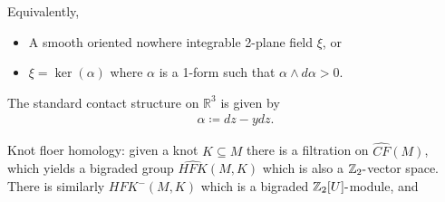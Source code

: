 \begin{definition}

Equivalently,

\begin{itemize}
\item
  A smooth oriented nowhere integrable 2-plane field \(\xi\), or
\item
  \(\xi = \ker( \alpha)\) where \(\alpha\) is a 1-form such that
  \(\alpha\wedge d \alpha > 0\).
\end{itemize}

\end{definition}

\begin{example}[?]

The standard contact structure on \({\mathbb{R}}^3\) is given by
\begin{align*}
\alpha\coloneqq dz - ydz
.\end{align*}

\end{example}

Knot floer homology: given a knot \(K \subseteq M\) there is a
filtration on \(\widehat{CF}(M)\), which yields a bigraded group
\(\widehat{HFK}(M, K)\) which is also a
\({\mathbb{Z}}_2{\hbox{-}}\)vector space. There is similarly
\(HFK^-(M, K)\) which is a bigraded
\({\mathbb{Z}}_2[U] {\hbox{-}}\)module, and

\cleardoublepage

\renewcommand{\listtheoremname}{}
\listoftheorems[ignoreall,show={definition}, numwidth=3.5em]
\cleardoublepage

\renewcommand{\listtheoremname}{}
\listoftheorems[ignoreall,show={theorem,proposition}, numwidth=3.5em]
\cleardoublepage

\renewcommand{\listtheoremname}{}
\listoftheorems[ignoreall,show={exercise}, numwidth=3.5em]
\cleardoublepage

\listoffigures
\cleardoublepage


\printbibliography[title=Bibliography]



